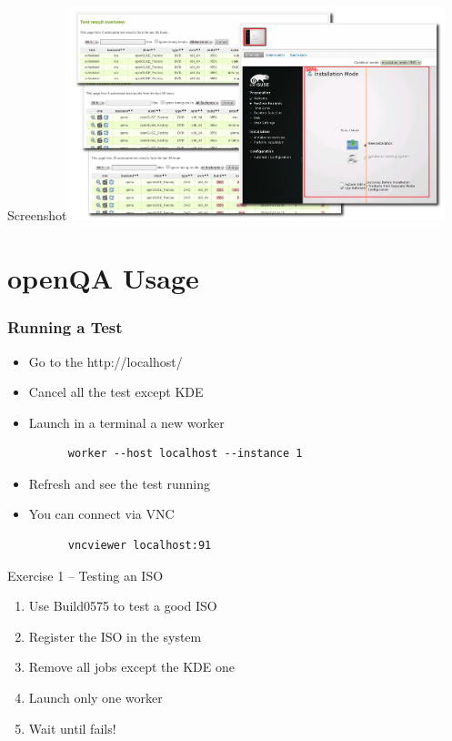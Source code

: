 \documentclass{beamer}
\begin{document}
%
%
\begin{frame}{Screenshot}
  \includegraphics[height=6.2cm,width=10.88cm]{screenshot}
\end{frame}


\section{openQA Usage}
%
%
\begin{frame}[fragile]
  \frametitle{Running a Test}
  \begin{itemize}
  \item Go to the http://localhost/
  \item Cancel all the test except KDE
  \item Launch in a terminal a new worker
    \lstset{style=mybash}
    \begin{lstlisting}
      worker --host localhost --instance 1
    \end{lstlisting}
  \item Refresh and see the test running
  \item You can connect via VNC
    \lstset{style=mybash}
    \begin{lstlisting}
      vncviewer localhost:91
    \end{lstlisting}
  \end{itemize}
\end{frame}

%
%
\begin{frame}{Exercise 1 -- Testing an ISO}
  \begin{enumerate}
  \item Use Build0575 to test a good ISO
  \item Register the ISO in the system
  \item Remove all jobs except the KDE one
  \item Launch only one worker
  \item Wait until fails!
  \end{enumerate}
\end{frame}
\end{document}
